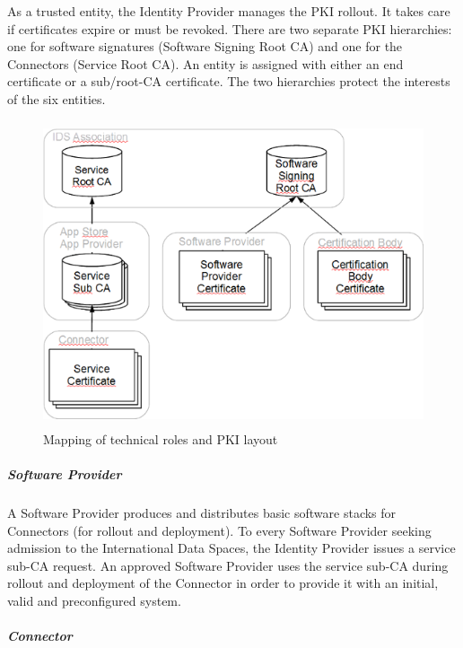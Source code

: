 As a trusted entity, the Identity Provider manages the PKI rollout. It takes care if certificates expire or must be revoked. There are two separate PKI hierarchies: one for software signatures (Software Signing Root CA) and one for the Connectors (Service Root CA). An entity is assigned with either an end certificate or a sub/root-CA certificate. The two hierarchies protect the interests of the six entities.




\begin{figure}[H]
	\begin{Center}
		\includegraphics[width=4.63in,height=3.55in]{./media/image62.png}
		\caption{ Mapping of technical roles and PKI layout}
		\label{fig:_Mapping_of_technical_roles_and_PKI_layout}
	\end{Center}
\end{figure}




\subparagraph*{Software Provider \\}

A Software Provider produces and distributes basic software stacks for Connectors (for rollout and deployment). To every Software Provider seeking admission to the International Data Spaces, the Identity Provider issues a service sub-CA request. An approved Software Provider uses the service sub-CA during rollout and deployment of the Connector in order to provide it with an initial, valid and preconfigured system.

\subparagraph*{Connector \\}

